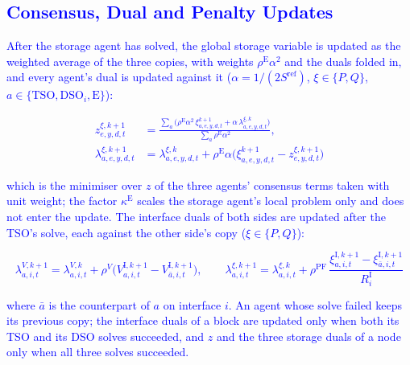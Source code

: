 \documentclass[preprint,12pt]{elsarticle}
\begin{document}
\subsection{\textcolor{blue}{Consensus, Dual and Penalty Updates}}
\label{app:admm_updated_updates}

\textcolor{blue}{
    After the storage agent has solved, the global storage variable is updated as the weighted average of the three copies, with weights $\rho^{\text{E}} \alpha^2$ and the duals folded in, and every agent's dual is updated against it ($\alpha = 1/(2 S^{\text{ref}})$, $\xi \in \{P,Q\}$, $a \in \{\text{TSO}, \text{DSO}_i, \text{E}\}$):
}

\textcolor{blue}{
    \begin{equation}
        \begin{aligned}
            z^{\xi,k+1}_{e,y,d,t} &=
            \frac{\sum_{a} \big( \rho^{\text{E}} \alpha^2\, \xi^{k+1}_{a,e,y,d,t} + \alpha\, \lambda^{\xi,k}_{a,e,y,d,t} \big)}
                 {\sum_{a} \rho^{\text{E}} \alpha^2}, \\
            \lambda^{\xi,k+1}_{a,e,y,d,t} &= \lambda^{\xi,k}_{a,e,y,d,t} + \rho^{\text{E}} \alpha
            \big( \xi^{k+1}_{a,e,y,d,t} - z^{\xi,k+1}_{e,y,d,t} \big)
        \end{aligned}
        \label{eq:admm_z_update}
    \end{equation}
}

\noindent
\textcolor{blue}{
    which is the minimiser over $z$ of the three agents' consensus terms taken with unit weight; the factor $\kappa^{\text{E}}$ scales the storage agent's local problem only and does not enter the update. The interface duals of both sides are updated after the TSO's solve, each against the other side's copy ($\xi \in \{P,Q\}$):
}

\textcolor{blue}{
    \begin{equation}
        \lambda^{V,k+1}_{a,i,t} = \lambda^{V,k}_{a,i,t} + \rho^{V} \big( V^{\text{I},k+1}_{a,i,t} - V^{\text{I},k+1}_{\bar a,i,t} \big),
        \qquad
        \lambda^{\xi,k+1}_{a,i,t} = \lambda^{\xi,k}_{a,i,t} + \rho^{\text{PF}}\,
        \frac{\xi^{\text{I},k+1}_{a,i,t} - \xi^{\text{I},k+1}_{\bar a,i,t}}{R^{\text{I}}_i}
        \label{eq:admm_interface_duals}
    \end{equation}
}

\noindent
\textcolor{blue}{
    where $\bar a$ is the counterpart of $a$ on interface $i$. An agent whose solve failed keeps its previous copy; the interface duals of a block are updated only when both its TSO and its DSO solves succeeded, and $z$ and the three storage duals of a node only when all three solves succeeded.
}
\end{document}
